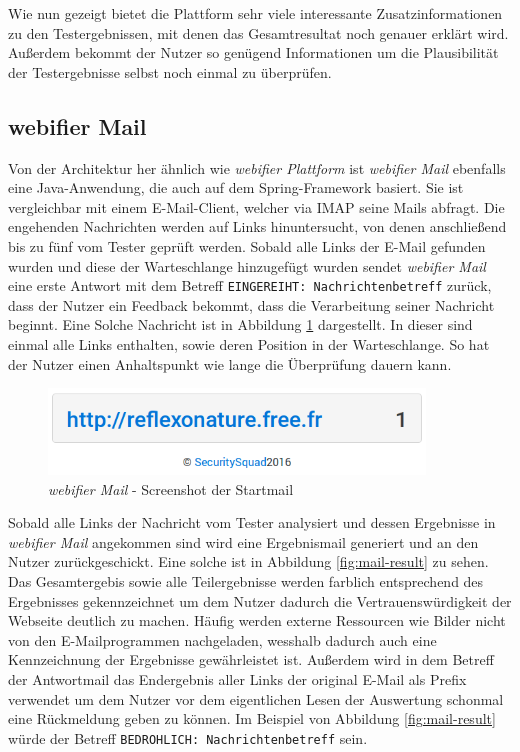 Wie nun gezeigt bietet die Plattform sehr viele interessante Zusatzinformationen zu den
Testergebnissen, mit denen das Gesamtresultat noch genauer erklärt wird. Außerdem bekommt der Nutzer so genügend Informationen um die Plausibilität der Testergebnisse selbst noch einmal zu überprüfen.

\subsection{webifier Mail}

Von der Architektur her ähnlich wie \textit{webifier Plattform} ist \textit{webifier Mail}
ebenfalls eine Java-Anwendung, die auch auf dem Spring-Framework basiert. Sie ist vergleichbar mit
einem E-Mail-Client, welcher via \acs{IMAP} seine Mails abfragt. Die engehenden Nachrichten werden
auf Links hinuntersucht, von denen anschließend bis zu fünf vom Tester geprüft werden. Sobald alle
Links der E-Mail gefunden wurden und diese der Warteschlange hinzugefügt wurden sendet
\textit{webifier Mail} eine erste Antwort mit dem Betreff \lstinline[style=eclipse]{EINGEREIHT:
Nachrichtenbetreff} zurück, dass der Nutzer ein Feedback bekommt, dass die Verarbeitung seiner
Nachricht beginnt. Eine Solche Nachricht ist in Abbildung \ref{fig:mail-start} dargestellt. In
dieser sind einmal alle Links enthalten, sowie deren Position in der Warteschlange. So hat der
Nutzer einen Anhaltspunkt wie lange die Überprüfung dauern kann.

\begin{figure}[H]
	\centering
	\includegraphics[width=10cm]{images/mail-start.png}
	\caption{\textit{webifier Mail} - Screenshot der Startmail}
	\label{fig:mail-start}
\end{figure}

Sobald alle Links der Nachricht vom Tester analysiert und dessen Ergebnisse in \textit{webifier
Mail} angekommen sind wird eine Ergebnismail generiert und an den Nutzer zurückgeschickt. Eine
solche ist in Abbildung \ref{fig:mail-result} zu sehen. Das Gesamtergebis sowie alle Teilergebnisse
werden farblich entsprechend des Ergebnisses gekennzeichnet um dem Nutzer dadurch die
Vertrauenswürdigkeit der Webseite deutlich zu machen. Häufig werden externe Ressourcen wie Bilder
nicht von den E-Mailprogrammen nachgeladen, wesshalb dadurch auch eine Kennzeichnung der Ergebnisse
gewährleistet ist. Außerdem wird in dem Betreff der Antwortmail das Endergebnis aller Links der
original E-Mail als Prefix verwendet um dem Nutzer vor dem eigentlichen Lesen der Auswertung
schonmal eine Rückmeldung geben zu können. Im Beispiel von Abbildung \ref{fig:mail-result} würde
der Betreff \lstinline[style=eclipse]{BEDROHLICH: Nachrichtenbetreff} sein.

